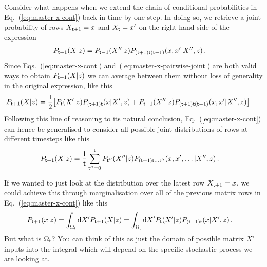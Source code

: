 Consider what happens when we extend the chain of conditional probabilities in Eq.~(\ref{eq:master-x-cont}) back in time by one step. In doing so, we retrieve a joint probability of rows $X_{{\sf t}+1}=x$ and $X_{{\sf t}}=x'$ on the right hand side of the expression 
\begin{align}
P_{{\sf t}+1}(X\vert z) &= P_{{\sf t}-1}(X''\vert z) P_{({\sf t}+1){\sf t}({\sf t}-1)}(x,x'\vert X'',z) \label{eq:master-x-pairwise-joint}\,.
\end{align}
Since Eqs.~(\ref{eq:master-x-cont}) and~(\ref{eq:master-x-pairwise-joint}) are both valid ways to obtain $P_{{\sf t}+1}(X\vert z)$ we can average between them without loss of generality in the original expression, like this
\begin{align}
P_{{\sf t}+1}(X\vert z) &= \frac{1}{2}\big[ P_{{\sf t}}(X'\vert z) P_{({\sf t}+1){\sf t}}(x\vert X',z) + P_{{\sf t}-1}(X''\vert z) P_{({\sf t}+1){\sf t}({\sf t}-1)}(x,x'\vert X'',z) \big]\,.
\end{align}
Following this line of reasoning to its natural conclusion, Eq.~(\ref{eq:master-x-cont}) can hence be generalised to consider all possible joint distributions of rows at different timesteps like this
\begin{align}
P_{{\sf t}+1}(X\vert z) &= \frac{1}{{\sf t}}\sum_{{\sf t}''=0}^{{\sf t}}P_{{\sf t}''}(X''\vert z) P_{({\sf t}+1){\sf t}\dots{\sf t}''}(x,x',\dots \vert X'',z) \label{eq:master-x-cont-sum-gen}\,.
\end{align}

If we wanted to just look at the distribution over the latest row $X_{{\sf t}+1}=x$, we could achieve this through marginalisation over all of the previous matrix rows in Eq.~(\ref{eq:master-x-cont}) like this
\begin{align}
P_{{\sf t}+1}(x\vert z) = \int_{\Omega_{{\sf t}}}{\rm d}X' P_{{\sf t}+1}(X\vert z) &= \int_{\Omega_{{\sf t}}}{\rm d}X' P_{{\sf t}}(X'\vert z) P_{({\sf t}+1){\sf t}}(x\vert X',z) \label{eq:master-x-cont-latest-row} \,.
\end{align}
But what is $\Omega_{\sf t}$? You can think of this as just the domain of possible matrix $X'$ inputs into the integral which will depend on the specific stochastic process we are looking at. 

